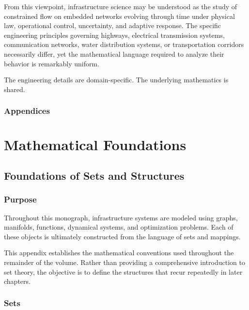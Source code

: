 \documentclass[11pt,fleqn]{book}
\numberwithin{equation}{chapter}
\theoremstyle{plain}
\theoremstyle{definition}
\theoremstyle{remark}
\begin{document}
From this viewpoint, infrastructure science may be understood as the study of constrained flow on embedded networks evolving through time under physical law, operational control, uncertainty, and adaptive response. The specific engineering principles governing highways, electrical transmission systems, communication networks, water distribution systems, or transportation corridors necessarily differ, yet the mathematical language required to analyze their behavior is remarkably uniform.

The engineering details are domain-specific. The underlying mathematics is shared.

\newpage 
\section*{Appendices}

\appendix
\part{Mathematical Foundations}

\chapter{Foundations of Sets and Structures}

\section{Purpose}

Throughout this monograph, infrastructure systems are modeled using
graphs, manifolds, functions, dynamical systems, and optimization
problems. Each of these objects is ultimately constructed from the
language of sets and mappings.

This appendix establishes the mathematical conventions used throughout
the remainder of the volume. Rather than providing a comprehensive
introduction to set theory, the objective is to define the structures
that recur repeatedly in later chapters.


\section{Sets}
\end{document}

